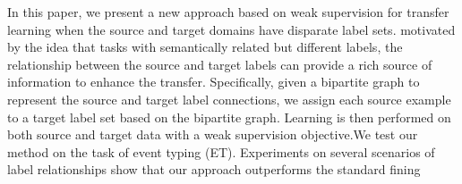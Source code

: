 In this paper, we present a new approach based on weak supervision for transfer learning when the source and target domains have disparate label sets. motivated by the idea that tasks with semantically related but different labels, the relationship between the source and target labels can provide a rich source of information to enhance the transfer. Specifically, given a bipartite graph to represent the source and target label connections, we assign each source example to a target label set based on the bipartite graph. Learning is then performed on both source and target data with a weak supervision objective.We test our method on the task of event typing (ET). Experiments on several scenarios of label relationships show that our approach outperforms the standard fining
